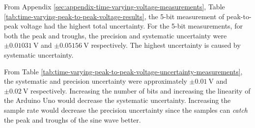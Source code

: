 From Appendix \ref{sec:appendix-time-varying-voltage-measurements}, Table \ref{tab:time-varying-peak-to-peak-voltage-results}, 
the 5-bit measurement of peak-to-peak voltage had the highest total uncertainty. For the 5-bit measurements, for both the peak and troughs, 
the precision and systematic uncertainty were $\pm\qty{0.01031}{\volt}$ and $\pm\qty{0.05156}{\volt}$ respectively. The highest uncertainty is caused by 
systematic uncertainty.

From Table \ref{tab:time-varying-peak-to-peak-voltage-uncertainty-measurements}, the systematic and precision uncertainty were approximately
$\pm\qty{0.01}{\volt}$ and $\pm\qty{0.02}{\volt}$ respectively. Increasing the number of bits and increasing the linearity of the Arduino Uno would decrease the systematic uncertainty.
Increasing the sample rate would decrease the precision uncertainty since the samples can \textit{catch} the peak and troughs of the sine wave better.  